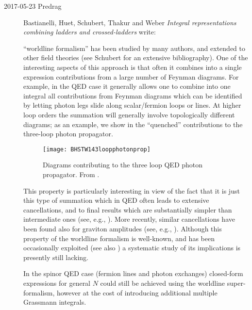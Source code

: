 \begin{description}
\item[2017-05-23 Predrag]
Bastianelli, Huet, Schubert, Thakur and Weber
{\em Integral representations combining ladders and crossed-ladders}
write:

``worldline formalism'' has been studied by many authors, and extended to
other field theories (see Schubert for an extensive
bibliography). One of the interesting aspects of this approach is that
often it combines into a single expression contributions from a large
number of Feynman diagrams. For example, in the QED case it generally
allows one to combine into one integral all contributions from Feynman
diagrams which can be identified by letting photon legs slide along
scalar/fermion loops or lines. At higher loop orders the summation will
generally involve topologically different diagrams;  as an example, we
show in  the ``quenched'' contributions to
the three-loop photon propagator.

\begin{figure}[h]
\texttt{[image: BHSTW143loopphotonprop]}
 \caption{Diagrams contributing to the three loop QED photon propagator.
 From .
 }
 \label{BHSTW143loopphotonprop}
\end{figure}

This property is particularly interesting in view of the fact that it is
just this type of summation which in QED often leads to extensive
cancellations, and to final results which are substantially simpler than
intermediate ones (see, e.g., ). More recently, similar
cancellations have been found also for graviton amplitudes (see, e.g.,
).
Although this property of the worldline formalism is well-known, and has
been occasionally exploited (see also
) a systematic study of its implications is
presently still lacking.

In the spinor QED case (fermion lines and photon exchanges) closed-form
expressions for general $N$ could still be achieved using the worldline
super-\,formalism, however at the cost of introducing
additional multiple Grassmann integrals.


\end{description}
